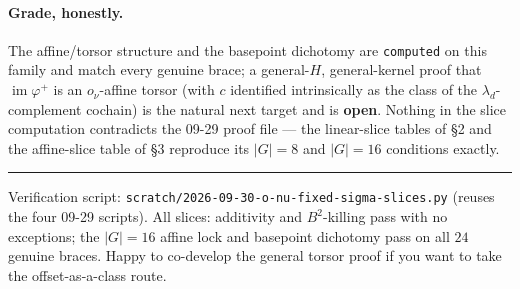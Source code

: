 \documentclass[11pt]{article}
\newcommand{\im}{\operatorname{im}}
\begin{document}
\paragraph{Grade, honestly.} The affine/torsor structure and the basepoint
dichotomy are \texttt{computed} on this family and match every genuine brace; a
general-$H$, general-kernel proof that $\im\varphi^+$ is an $o_\nu$-affine torsor
(with $c$ identified intrinsically as the class of the $\lambda_d$-complement
cochain) is the natural next target and is \textbf{open}. Nothing in the slice
computation contradicts the 09-29 proof file --- the linear-slice tables of \S2
and the affine-slice table of \S3 reproduce its $|G|=8$ and $|G|=16$ conditions
exactly.

\vspace{0.8em}
\hrule
\vspace{0.4em}
\small
Verification script: \texttt{scratch/2026-09-30-o-nu-fixed-sigma-slices.py}
(reuses the four 09-29 scripts). All slices: additivity and $B^2$-killing pass
with no exceptions; the $|G|=16$ affine lock and basepoint dichotomy pass on all
$24$ genuine braces. Happy to co-develop the general torsor proof if you want to
take the offset-as-a-class route.
\end{document}
